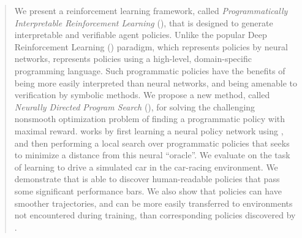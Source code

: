 \begin{abstract}
We present a reinforcement learning framework, called {\em Programmatically
    Interpretable Reinforcement Learning} (\pirl), that is designed to 
generate interpretable and verifiable
  agent policies. Unlike the popular Deep
  Reinforcement Learning (\drl) paradigm, which represents policies by
  neural networks, \pirl 
represents policies using a high-level, domain-specific programming language. Such 
  programmatic policies have the benefits of being more easily
  interpreted than neural networks, and being amenable to verification by symbolic
  methods. We propose a new method, called {\em
    Neurally Directed Program Search} (\algo), for solving the
  challenging nonsmooth optimization problem of finding a
  programmatic policy with maximal reward. \algo works by first learning a neural policy
  network using \drl, and then performing a local search over
  programmatic policies that
  seeks to minimize a distance from this neural
  ``oracle''. We evaluate \algo on the task of learning to drive a
  simulated car in the \torcs car-racing environment. We demonstrate
  that \algo is able to discover human-readable policies that pass
  some significant performance bars. We also show that
\pirl policies can have 
  smoother trajectories, and can be 
  more easily transferred to environments not encountered during
  training, than corresponding policies discovered by \drl.
\end{abstract}